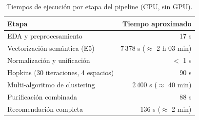 \begin{table}[htbp]
    \centering
    \caption{Tiempos de ejecución por etapa del pipeline (CPU, sin GPU).}
    \label{tab:tiempos_ejecucion}
    \begin{tabular}{lr}
        \toprule
        Etapa & Tiempo aproximado \\
        \midrule
        EDA y preprocesamiento & 17 s \\
        Vectorización semántica (E5) & 7\,378 s ($\approx$ 2 h 03 min) \\
        Normalización y unificación & $<$ 1 s \\
        Hopkins (30 iteraciones, 4 espacios) & 90 s \\
        Multi-algoritmo de clustering & 2\,400 s ($\approx$ 40 min) \\
        Purificación combinada & 88 s \\
        Recomendación completa & 136 s ($\approx$ 2 min) \\
        \bottomrule
    \end{tabular}
\end{table}